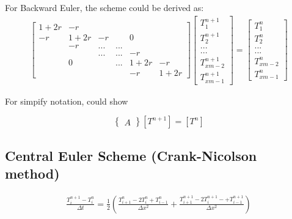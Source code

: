 \documentclass[12pt]{article}
\begin{document}
For Backward Euler, the scheme could be derived as:
\begin{align}
\begin{bmatrix}1+2r&-r&&&&\\ -r&1+2r&-r&&0&\\ &-r&...&...&&\\ &&...&...&-r&\\ &0&&...&1+2r&-r\\ &&&&-r&1+2r\end{bmatrix} \begin{bmatrix}T^{n+1}_{1}\\ T^{n+1}_{2}\\ ...\\ ...\\ T^{n+1}_{xm-2}\\ T^{n+1}_{xm-1}\end{bmatrix} 
=\begin{bmatrix}T^{n}_{1}\\ T^{n}_{2}\\ ...\\ ...\\ T^{n}_{xm-2}\\ T^{n}_{xm-1}\end{bmatrix}  
\end{align}

For simpify notation, could show

$$\begin{Bmatrix}A\end{Bmatrix} \left[ T^{n+1}\right]  =\left[ T^{n}\right]  $$


\subsection{Central Euler Scheme (Crank-Nicolson method)}

\begin{align}
\frac{T_i^{n+1}-{T_i^n}}{\Delta t} = \frac{1}{2} \left(\frac{T_{i+1}^n-2 T_i^n+T_{i-1}^n}{\Delta x^2}+\frac{T_{i+1}^{n+1}-2 T_i^{n+1}-+T_{i-1}^{n+1}}{\Delta x^2}\right)  
\end{align}
\end{document}
